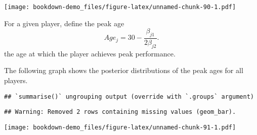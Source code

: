 \documentclass[
]{book}
\newenvironment{Shaded}{\begin{snugshade}}{\end{snugshade}}
\newcommand{\DataTypeTok}[1]{\textcolor[rgb]{0.13,0.29,0.53}{#1}}
\newcommand{\DecValTok}[1]{\textcolor[rgb]{0.00,0.00,0.81}{#1}}
\newcommand{\KeywordTok}[1]{\textcolor[rgb]{0.13,0.29,0.53}{\textbf{#1}}}
\newcommand{\NormalTok}[1]{#1}
\newcommand{\OperatorTok}[1]{\textcolor[rgb]{0.81,0.36,0.00}{\textbf{#1}}}
\newcommand{\StringTok}[1]{\textcolor[rgb]{0.31,0.60,0.02}{#1}}
\begin{document}
\texttt{[image: bookdown-demo\_files/figure-latex/unnamed-chunk-90-1.pdf]}

For a given player, define the peak age
\[
Age_j = 30 - \frac{\beta_{j1}}{2 \beta_{j2}}.
\]
the age at which the player achieves peak performance.

The following graph shows the posterior distributions of the peak ages for all players.

\begin{Shaded}
\end{Shaded}

\begin{verbatim}
## `summarise()` ungrouping output (override with `.groups` argument)
\end{verbatim}

\begin{verbatim}
## Warning: Removed 2 rows containing missing values (geom_bar).
\end{verbatim}

\texttt{[image: bookdown-demo\_files/figure-latex/unnamed-chunk-91-1.pdf]}

  
\end{document}
